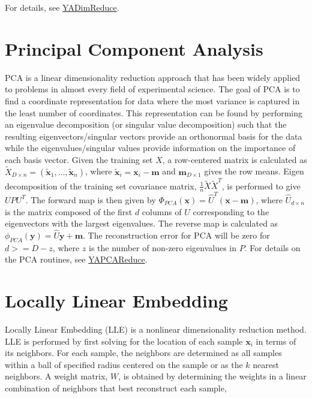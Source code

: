 For details, see \hyperlink{class_y_a_dim_reduce}{YADim\-Reduce}.

\par
 \par
 \hypertarget{index_pca}{}\section{Principal Component Analysis}\label{index_pca}
PCA is a linear dimensionality reduction approach that has been widely applied to problems in almost every field of experimental science. The goal of PCA is to find a coordinate representation for data where the most variance is captured in the least number of coordinates. This representation can be found by performing an eigenvalue decomposition (or singular value decomposition) such that the resulting eigenvectors/singular vectors provide an orthonormal basis for the data while the eigenvalues/singular values provide information on the importance of each basis vector. Given the training set $X$, a row-centered matrix is calculated as $\widetilde{X}_{D \times n} = (\widetilde{\mathbf{x}}_1, \dots, \widetilde{\mathbf{x}}_n)$, where $\widetilde{\mathbf{x}}_i = \mathbf{x}_i - \mathbf{m}$ and $\mathbf{m}_{D \times 1}$ gives the row means. Eigen decomposition of the training set covariance matrix, $\frac{1}{n} \widetilde{X} \widetilde{X}^T$, is performed to give $U P U^T$. The forward map is then given by $\Phi_{PCA}(\mathbf{x})=\widehat{U}^T (\mathbf{x}-\mathbf{m})$, where $\widehat{U}_{d \times n}$ is the matrix composed of the first $d$ columns of $U$ corresponding to the eigenvectors with the largest eigenvalues. The reverse map is calculated as $\phi_{PCA}(\mathbf{y})=\widehat{U} \mathbf{y} + \mathbf{m}.$ The reconstruction error for PCA will be zero for $d>=D-z$, where $z$ is the number of non-zero eigenvalues in $P$. For details on the PCA routines, see \hyperlink{class_y_a_p_c_a_reduce}{YAPCAReduce}.

\par
 \par
 \hypertarget{index_lle}{}\section{Locally Linear Embedding}\label{index_lle}
Locally Linear Embedding (LLE) is a nonlinear dimensionality reduction method. LLE is performed by first solving for the location of each sample $\mathbf{x}_i$ in terms of its neighbors. For each sample, the neighbors are determined as all samples within a ball of specified radius centered on the sample or as the $k$ nearest neighbors. A weight matrix, $W$, is obtained by determining the weights in a linear combination of neighbors that best reconstruct each sample,


